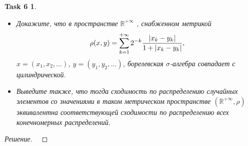 \documentclass[12pt,a4paper]{extarticle}
\newtheorem*{task6}{Task 6}
\newcommand{\R}{\mathbb{R}}
\begin{document}
\vspace{\baselineskip}

\begin{task6}
	\begin{itemize}
		\item[a)] Докажите, что в пространстве $\R^{+\infty}$ , снабженном метрикой
		\[
			\rho(x, y) = \sum_{k=1}^{+\infty} 2^{-k} {|x_k - y_k| \over 1 + |x_k - y_k|},
		\]
		$x = (x_1 , x_2 ,\ldots)$, $y = (y_1, y_2 ,\ldots)$, борелевская $\sigma$-алгебра совпадает с цилиндрической.
		
		\item[b)] Выведите также, что тогда сходимость по распределению случайных элементов со значениями в таком метрическом пространстве 
		$(\R^{+\infty} , \rho)$ эквивалентна соответствующей сходимости по распределению всех конечномерных распределений.
	\end{itemize}
\end{task6}
\begin{proof}[Решение]
	\
	
	
\end{proof}


	
	
\end{document}
